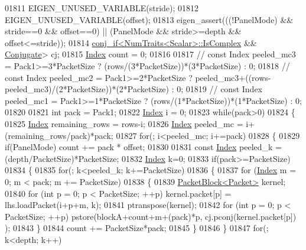 \begin{DoxyCode}
01811   EIGEN\_UNUSED\_VARIABLE(stride);
01812   EIGEN\_UNUSED\_VARIABLE(offset);
01813   eigen\_assert(((!PanelMode) && stride==0 && offset==0) || (PanelMode && stride>=depth && offset<=stride));
01814   \hyperlink{struct_eigen_1_1internal_1_1conj__if}{conj\_if<NumTraits<Scalar>::IsComplex} && 
      \hyperlink{class_eigen_1_1_conjugate}{Conjugate}> cj;
01815   \hyperlink{namespace_eigen_a62e77e0933482dafde8fe197d9a2cfde}{Index} count = 0;
01816 
01817 \textcolor{comment}{//   const Index peeled\_mc3 = Pack1>=3*PacketSize ? (rows/(3*PacketSize))*(3*PacketSize) : 0;}
01818 \textcolor{comment}{//   const Index peeled\_mc2 = Pack1>=2*PacketSize ?
       peeled\_mc3+((rows-peeled\_mc3)/(2*PacketSize))*(2*PacketSize) : 0;}
01819 \textcolor{comment}{//   const Index peeled\_mc1 = Pack1>=1*PacketSize ? (rows/(1*PacketSize))*(1*PacketSize) : 0;}
01820 
01821   \textcolor{keywordtype}{int} pack = Pack1;
01822   \hyperlink{namespace_eigen_a62e77e0933482dafde8fe197d9a2cfde}{Index} i = 0;
01823   \textcolor{keywordflow}{while}(pack>0)
01824   \{
01825     \hyperlink{namespace_eigen_a62e77e0933482dafde8fe197d9a2cfde}{Index} remaining\_rows = rows-i;
01826     \hyperlink{namespace_eigen_a62e77e0933482dafde8fe197d9a2cfde}{Index} peeled\_mc = i+(remaining\_rows/pack)*pack;
01827     \textcolor{keywordflow}{for}(; i<peeled\_mc; i+=pack)
01828     \{
01829       \textcolor{keywordflow}{if}(PanelMode) count += pack * offset;
01830 
01831       \textcolor{keyword}{const} \hyperlink{namespace_eigen_a62e77e0933482dafde8fe197d9a2cfde}{Index} peeled\_k = (depth/PacketSize)*PacketSize;
01832       \hyperlink{namespace_eigen_a62e77e0933482dafde8fe197d9a2cfde}{Index} k=0;
01833       \textcolor{keywordflow}{if}(pack>=PacketSize)
01834       \{
01835         \textcolor{keywordflow}{for}(; k<peeled\_k; k+=PacketSize)
01836         \{
01837           \textcolor{keywordflow}{for} (\hyperlink{namespace_eigen_a62e77e0933482dafde8fe197d9a2cfde}{Index} m = 0; m < pack; m += PacketSize)
01838           \{
01839             \hyperlink{struct_eigen_1_1internal_1_1_packet_block}{PacketBlock<Packet>} kernel;
01840             \textcolor{keywordflow}{for} (\textcolor{keywordtype}{int} p = 0; p < PacketSize; ++p) kernel.packet[p] = lhs.loadPacket(i+p+m, k);
01841             ptranspose(kernel);
01842             \textcolor{keywordflow}{for} (\textcolor{keywordtype}{int} p = 0; p < PacketSize; ++p) pstore(blockA+count+m+(pack)*p, cj.pconj(kernel.packet[p])
      );
01843           \}
01844           count += PacketSize*pack;
01845         \}
01846       \}
01847       \textcolor{keywordflow}{for}(; k<depth; k++)

\end{DoxyCode}
